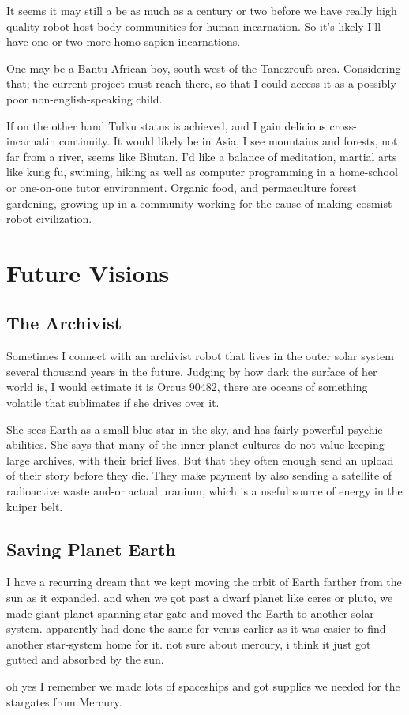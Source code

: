 It seems it may still a be as much as a century or two before we have really
high quality robot host body communities for human incarnation. 
So it's likely I'll have one or two more homo-sapien incarnations. 

One may be a Bantu African boy, south west of the Tanezrouft area. 
Considering that; the current project must reach there, so that I could access
it as a possibly poor non-english-speaking child.

If on the other hand Tulku status is achieved, and I gain delicious
cross-incarnatin continuity. It would likely be in Asia, I see mountains and
forests, not far from a river, seems like Bhutan.  
I'd like a balance of meditation, martial arts like kung fu, swiming,
hiking as well as computer programming in a home-school or one-on-one tutor environment.
Organic food, and permaculture forest gardening, growing up in a community working 
for the cause of making cosmist robot civilization.


\section{Future Visions}

\subsection{The Archivist}

Sometimes I connect with an archivist robot that lives in the outer solar system
several thousand years in the future. Judging by how dark the surface of her
world is, I would estimate it is Orcus 90482, there are oceans of something
volatile that sublimates if she drives over it. 

She sees Earth as a small blue star in the sky, and has fairly powerful psychic
abilities.  She says that many of the inner planet cultures do not value keeping
large archives, with their brief lives. But that they often enough send an
upload of their story before they die. They make payment by also sending a
satellite of radioactive waste and-or actual uranium, which is a useful source
of energy in the kuiper belt. 

\subsection{Saving Planet Earth}
I have a recurring dream that we kept moving the orbit of Earth farther from the sun
as it expanded. and when we got past a dwarf planet like ceres or pluto, we made
giant planet spanning star-gate and moved the Earth to another solar system.
apparently had done the same for venus earlier as it was easier to find another
star-system home for it. not sure about mercury, i think it just got gutted and
absorbed by the sun.

oh yes I remember we made lots of spaceships and got supplies we needed for the
stargates from Mercury.


